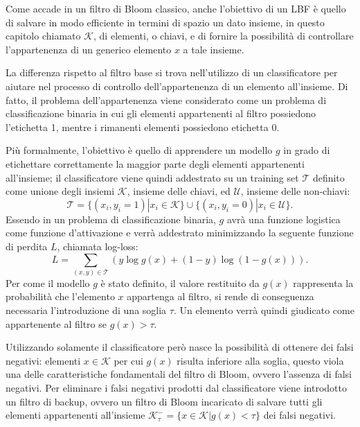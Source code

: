 \documentclass[../../main.tex]{subfiles}
\begin{document}
    Come accade in un filtro di Bloom classico, anche l'obiettivo di un LBF è quello di salvare in modo efficiente in termini di spazio un dato insieme, in questo capitolo chiamato $\mathcal{K}$, di elementi, o chiavi, e di fornire la possibilità di controllare l'appartenenza di un generico elemento $x$ a tale insieme.

    La differenza rispetto al filtro base si trova nell'utilizzo di un classificatore per aiutare nel processo di controllo dell'appartenenza di un elemento all'insieme. Di fatto, il problema dell'appartenenza viene considerato come un problema di classificazione binaria in cui gli elementi appartenenti al filtro possiedono l'etichetta 1, mentre i rimanenti elementi possiedono etichetta 0.

    Più formalmente, l'obiettivo è quello di apprendere un modello $g$ in grado di etichettare correttamente la maggior parte degli elementi appartenenti all'insieme; il classificatore viene quindi addestrato su un training set $\mathcal{T}$ definito come unione degli insiemi $\mathcal{K}$, insieme delle chiavi, ed $\mathcal{U}$, insieme delle non-chiavi:
    \begin{equation}
        \mathcal{T} = \{(x_i, y_i = 1) | x_i \in \mathcal{K}\} \cup \{(x_i, y_i = 0) | x_i \in \mathcal{U}\}.
    \end{equation}
    Essendo in un problema di classificazione binaria, $g$ avrà una funzione logistica come funzione d'attivazione e verrà addestrato minimizzando la seguente funzione di perdita $L$, chiamata log-loss:
    \begin{equation}
        L = \sum_{(x,y) \in \mathcal{T}}\left(y \log g(x) + (1 - y) \log(1 - g(x))\right).
        \label{eqn:logloss}
    \end{equation}
    Per come il modello $g$ è stato definito, il valore restituito da $g(x)$ rappresenta la probabilità che l'elemento $x$ appartenga al filtro, si rende di conseguenza necessaria l'introduzione di una soglia $\tau$. Un elemento verrà quindi giudicato come appartenente al filtro se $g(x) > \tau$.
    
    Utilizzando solamente il classificatore però nasce la possibilità di ottenere dei falsi negativi: elementi $x \in \mathcal{K}$ per cui $g(x)$ risulta inferiore alla soglia, questo viola una delle caratteristiche fondamentali del filtro di Bloom, ovvero l'assenza di falsi negativi. Per eliminare i falsi negativi prodotti dal classificatore viene introdotto un filtro di backup, ovvero un filtro di Bloom incaricato di salvare tutti gli elementi appartenenti all'insieme $\mathcal{K}_{\tau}^- = \{x \in \mathcal{K} | g(x) < \tau\}$ dei falsi negativi.
\end{document}
